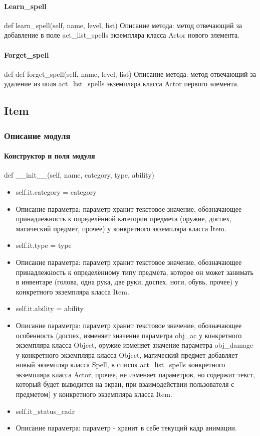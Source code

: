 \paragraph{Learn\_spell}
def learn\_spell(self, name, level, list)
Описание метода: метод отвечающий за добавление в поле act\_list\_spells экземпляра класса Actor нового элемента.
\paragraph{Forget\_spell}
def def forget\_spell(self, name, level, list)
Описание метода: метод отвечающий за удаление из поля act\_list\_spells экземпляра класса Actor первого элемента.

\subsection{Item}
\subsubsection{Описание модуля}
\paragraph{Конструктор и поля модуля}
def \_\_init\_\_(self, name, category, type, ability)
\begin{itemize}
	\item self.it.category = category 
	\item Описание параметра: параметр хранит текстовое значение, обозначающее принадлежность к определённой категории предмета (оружие, доспех, магический предмет, прочее) у конкретного экземпляра класса Item.
	\item self.it.type = type 
	\item Описание параметра: параметр хранит текстовое значение, обозначающее принадлежность к определённому типу предмета, которое он может занимать в инвентаре (голова, одна рука, две руки, доспех, ноги, обувь, прочее) у конкретного экземпляра класса Item.
	\item self.it.ability = ability %
	\item Описание параметра: параметр хранит текстовое значение, обозначающее особенность (доспех, изменяет значение параметра obj\_ac у конкретного экземпляра класса Object, оружие изменяет значение параметра obj\_damage у конкретного экземпляра класса Object, магический предмет добавляет новый экземпляр класса Spell, в список act\_list\_spells конкретного экземпляра класса Actor, прочее, не изменяет параметров, но содержит текст, который будет выводится на экран, при взаимодействии пользователя с предметом) у конкретного экземпляра класса Item.
	\item self.it\_status\_cadr
	\item Описание параметра: параметр - хранит в себе текущий кадр анимации.
\end{itemize}
